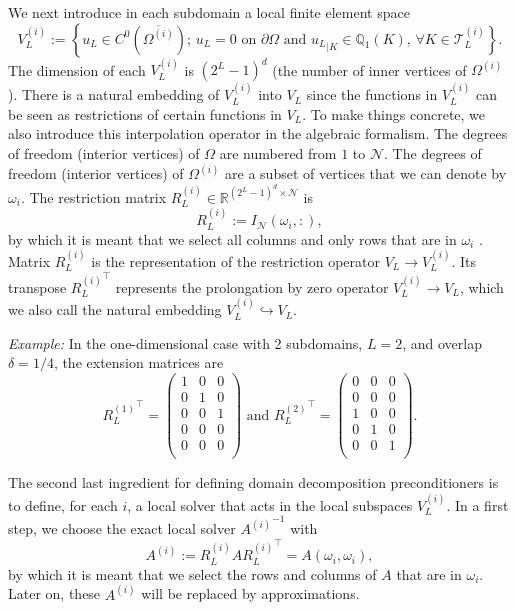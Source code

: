 \documentclass[onefignum,onetabnum]{siamart251216}
\begin{document}
We next introduce in each subdomain a local finite element space 
\[
V_L^{(i)} := \left\{u_L \in  C^0(\overline{\Omega^{(i)}}); \, u_L = 0 \text{ on } \partial \Omega \text{ and }  {u_L}_{|K} \in \mathbb Q_1(K), \,   \forall K \in \mathcal{T}_L^{(i)} \right\}.
\] 
The dimension of each $V_L^{(i)}$ is $(2^L-1)^{d}$ (the number of inner vertices of $\Omega^{(i)}$).
There is a natural embedding of $V_L^{(i)}$ into $V_L$ since the functions in $V_L^{(i)}$ can be seen as restrictions of certain functions in $V_L$. To make things concrete, we also introduce this interpolation operator in the algebraic formalism. The degrees of freedom (interior vertices) of $\Omega$ are numbered from $1$ to $\mathcal N$. The degrees of freedom (interior vertices) of $\Omega^{(i)}$ are a subset of vertices that we can denote by $\omega_i$. The restriction matrix $R_L^{(i)} \in \mathbb{R}^{(2^L - 1)^d \times \mathcal N}$ is
\[
R_L^{(i)} := I_\mathcal N(\omega_i, :),
\]  
by which it is meant that we select all columns and only rows that are in $\omega_i$ . 
Matrix $R_L^{(i)}$ is the representation of the restriction operator $V_L \rightarrow V_L^{(i)}$. Its transpose ${R_L^{(i)}}^\top$ represents the prolongation by zero operator $V_L^{(i)} \rightarrow V_L$, which we also call the natural embedding $V_L^{(i)} \hookrightarrow V_L$.

\textit{Example: } In the one-dimensional case with 2 subdomains, $L = 2$, and overlap $\delta=1/4$, the extension matrices are
\begin{equation*}
{R_L^{(1)}}^\top = 
\begin{pmatrix}
1 & 0 & 0 \\ 
0 & 1 & 0 \\ 
0 & 0 & 1 \\ 
0 & 0 & 0 \\ 
0 & 0 & 0 \\ 
\end{pmatrix} \text{ and }
{R_L^{(2)}}^\top = 
\begin{pmatrix}
0 & 0 & 0  \\ 
0 & 0 & 0  \\ 
1 & 0 & 0  \\ 
0 & 1 & 0  \\ 
0 & 0 & 1  \\ 
\end{pmatrix}.
\end{equation*}

The second last ingredient for defining domain decomposition preconditioners is to define, for each $i$, a local solver that acts in the local subspaces $V_L^{(i)}$. In a first step, we choose the exact local solver ${A^{(i)}}^{-1}$ with  
\[
A^{(i)} := R_L^{(i)} A {R_L^{(i)}}^\top = A(\omega_i, \omega_i), 
\]
by which it is meant that we select the rows and columns of $A$ that are in $\omega_i$. Later on, these $A^{(i)}$ will be replaced by approximations.
\end{document}
